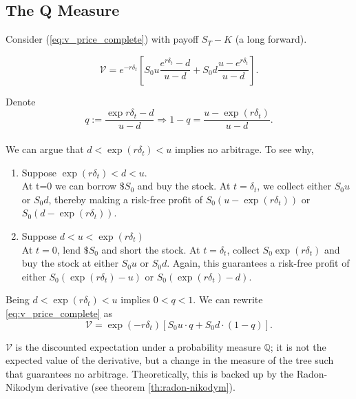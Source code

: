 \documentclass[../TGMAFFIRO.tex]{subfiles}
\begin{document}
\subsection{The Q Measure}
Consider  (\ref{eq:v_price_complete}) with payoff $S_T - K$ (a long forward).

\begin{equation*}
    \mathcal{V} = e^{-r\delta_t}\left[S_0u \frac{e^{r\delta_t} - d}{u - d} + S_0d \frac{u - e^{r\delta_t}}{u-d}\right].
\end{equation*}

Denote
\begin{equation}
    q:= \frac{\exp{r\delta_t} - d}{u - d} \Longrightarrow 1-q = \frac{u - \exp{(r\delta_t)}}{u-d}.
\end{equation}\\

We can argue that $d < \exp{(r\delta_t)} < u$ implies no arbitrage. To see why, 
\begin{enumerate}
\item Suppose $\exp{(r\delta_t)} < d < u$.\\
    At t=0 we can borrow $\$S_0$ and buy the stock. At $t=\delta_t$, we collect either $S_0u$ or $S_0d$, thereby making a risk-free profit of $S_0(u - \exp{(r\delta_t)})$ or $S_0(d - \exp{(r\delta_t)})$.

\item Suppose $d < u < \exp{(r\delta_t)}$\\
    At $t=0$, lend $\$S_0$ and short the stock. At $t=\delta_t$, collect $S_0\exp{(r\delta_t)}$ and buy the stock at either $S_0u$ or $S_0d$. Again, this guarantees a risk-free profit of either $S_0(\exp{(r\delta_t)} - u)$ or $S_0(\exp{(r\delta_t)} - d)$.
\end{enumerate}

Being $d < \exp{(r\delta_t)} < u$ implies $0 < q < 1$. We can rewrite \ref{eq:v_price_complete} as
\begin{equation} \label{eq:v_price}
    \mathcal{V} = \exp{(-r\delta_t)}[S_0u\cdot q + S_0d \cdot (1-q)].
\end{equation}


$\mathcal V$ is the discounted expectation under a probability measure $\mathbb Q$; it is not the expected value of the derivative, but a change in the measure of the tree such that guarantees no arbitrage. Theoretically, this is backed up by the Radon-Nikodym derivative (see theorem \ref{th:radon-nikodym}).
\end{document}
